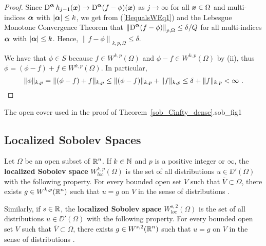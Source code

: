 \begin{proof}
Since
$\displaystyle
\operatorname{D}^{{\bm{\alpha}}} h_{j-1}({\bm{x}}) \to \operatorname{D}^{{\bm{\alpha}}} (f-\phi)({\bm{x}})$
as $j \to \infty$ for all ${\bm{x}} \in \Omega$ and multi-indices
${\bm{\alpha}}$ with $|{\bm{\alpha}}| \leq k$, we get from
(\ref{HequalsWEq1}) and the Lebesgue Monotone Convergence Theorem that
$\displaystyle \left\| \operatorname{D}^{{\bm{\alpha}}} (f - \phi)
\right\|_{p,\Omega} \leq \delta/Q$ for all multi-indices ${\bm{\alpha}}$ with
$|{\bm{\alpha}}| \leq k$.  Hence,
$\displaystyle \left\| f -\phi \right\|_{k,p,\Omega} \leq \delta$.

 We have that $\phi \in S$ because
$\displaystyle f\in W^{k,p}(\Omega)$
and $\displaystyle \phi-f \in W^{k,p}(\Omega)$ by (ii), thus
$\displaystyle \phi = (\phi-f) + f \in W^{k,p}(\Omega)$.
In particular,
\[
\|\phi \|_{k,p} = \| (\phi-f) + f \|_{k,p} \leq \| (\phi-f)\|_{k,p} +
\|f \|_{k,p} \leq \delta +\| f\|_{k,p} < \infty \ .  \qedhere
\]
\end{proof}

{The open cover used in the proof of Theorem~\ref{sob_Cinfty_dense}.}{sob_fig1}

\subsection{Localized Sobolev Spaces}

\begin{defn}
Let $\Omega$ be an open subset of $\displaystyle \mathbb{R}^n$.
If $k \in \mathbb{N}$ and $p$ is a positive integer or $\infty$, the
{\bfseries localized Sobolev space}
$\displaystyle W^{k,p}_{loc}(\Omega)$ is the set
of all distributions $u \in \DD'(\Omega)$ with the following property.
For every bounded open set $V$ such that $\overline{V}\subset \Omega$,
there exists $\displaystyle g\in W^{k,p}(\mathbb{R}^n)$ such that $u=g$ on
$V$ in the sense of distributions \footnotemark.\addtocounter{footnote}{-1}

Similarly, if $\displaystyle s \in \mathbb{R}$, the {\bfseries localized Sobolev space}
$\displaystyle W^{s,2}_{loc}(\Omega)$ is the set
of all distributions $u \in \DD'(\Omega)$ with the following property.
For every bounded open set $V$ such that $\overline{V}\subset \Omega$,
there exists $\displaystyle g\in W^{s,2}(\mathbb{R}^n)$ such that $u=g$ on
$V$ in the sense of distributions \footnotemark.
\end{defn}


